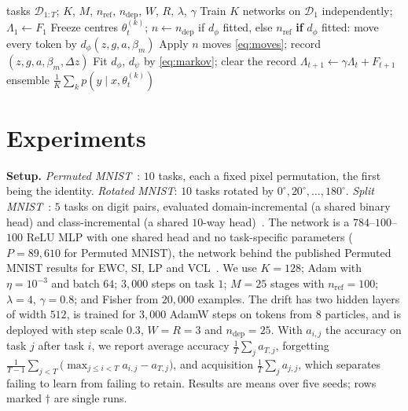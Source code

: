 \documentclass{article}
\newcommand{\Dt}{\mathcal{D}}
\newcommand{\thk}{\theta_t^{(k)}}
\begin{document}
\begin{algorithm}[t]
\caption{Posterior Schr\"odinger Bridges (PSB)}
\label{alg:psb}
\small
\begin{algorithmic}[1]
\Require tasks $\Dt_{1:T}$; $K$, $M$, $n_{\mathrm{ref}}$, $n_{\mathrm{dep}}$, $W$, $R$, $\lambda$, $\gamma$
\State Train $K$ networks on $\Dt_1$ independently; $\Lambda_1\gets F_1$
  \State Freeze centres $\thk$; $n\gets n_{\mathrm{dep}}$ if $d_\phi$ fitted, else $n_{\mathrm{ref}}$
   
    \State \textbf{if} $d_\phi$ fitted: move every token by $d_\phi(z,g,a,\beta_m)$
    \State Apply $n$ moves \eqref{eq:moves}; record $(z,g,a,\beta_m,\Delta z)$
  \EndFor
   
    \State Fit $d_\phi$, $d_\psi$ by \eqref{eq:markov}; clear the record
  \EndIf
  \State $\Lambda_{t+1}\gets\gamma\Lambda_t+F_{t+1}$
\EndFor
\State \Return ensemble $\tfrac1K\sum_k p(y\mid x,\thk)$
\end{algorithmic}
\end{algorithm}

\section{Experiments}
\label{sec:experiments}

\textbf{Setup.} \emph{Permuted MNIST}~\cite{goodfellow2013empirical}: $10$
tasks, each a fixed pixel permutation, the first being the identity.
\emph{Rotated MNIST}: $10$ tasks rotated by $0^\circ,20^\circ,\ldots,180^\circ$.
\emph{Split MNIST}~\cite{zenke2017si}: $5$ tasks on digit pairs, evaluated
domain-incremental (a shared binary head) and class-incremental (a shared
$10$-way head)~\cite{vandeven2019three}. The network is a $784$--$100$--$100$
ReLU MLP with one shared head and no task-specific parameters ($P=89{,}610$ for
Permuted MNIST), the network behind the published Permuted MNIST results for
EWC, SI, LP and VCL~\cite{nguyen2018vcl}. We use $K=128$; Adam with
$\eta=10^{-3}$ and batch $64$; $3{,}000$ steps on task $1$; $M=25$ stages with
$n_{\mathrm{ref}}=100$; $\lambda=4$, $\gamma=0.8$; and Fisher from $20{,}000$
examples. The drift has two hidden layers of width $512$, is trained for
$3{,}000$ AdamW steps on tokens from $8$ particles, and is deployed with step
scale $0.3$, $W=R=3$ and $n_{\mathrm{dep}}=25$. With $a_{i,j}$ the accuracy on
task $j$ after task $i$, we report average accuracy
$\tfrac1T\sum_j a_{T,j}$, forgetting
$\tfrac1{T-1}\sum_{j<T}\big(\max_{j\le i<T}a_{i,j}-a_{T,j}\big)$, and
acquisition $\tfrac1T\sum_j a_{j,j}$, which separates failing to learn from
failing to retain. Results are means over five seeds; rows marked $\dagger$ are
single runs.
\end{document}
